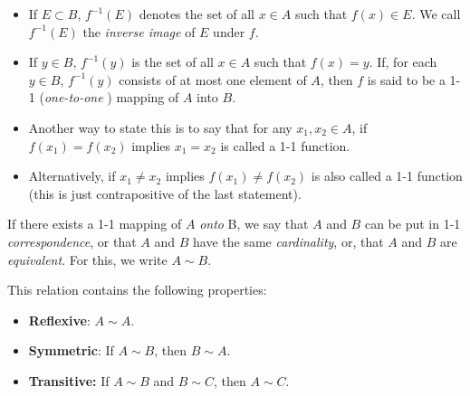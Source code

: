 \documentclass[11pt,a4paper]{book}
\begin{document}
\begin{definition}
   \begin{itemize}
       \item If \( E \subset B  \), \( f^{-1}(E) \) denotes the set of all \( x \in A  \) such that \( f(x) \in E  \). We call \( f^{-1}(E) \) the \textit{inverse image} of \( E  \) under \( f  \).
       \item If \( y \in B  \), \( f^{-1}(y) \) is the set of all \( x \in A  \) such that \( f(x) = y \). If, for each \( y \in B  \), \( f^{-1}(y) \) consists of at most one element of \( A  \), then \( f  \) is said to be a 1-1 (\textit{one-to-one} ) mapping of \( A  \) into \( B  \).
        \item Another way to state this is to say that for any \( {x}_{1}, {x}_{2} \in A  \), if \( f({x}_{1}) = f({x}_{2}) \) implies \( {x}_{1} = {x}_{2} \) is called a 1-1 function. 
        \item Alternatively, if \( {x}_{1} \neq {x}_{2}  \) implies \( f({x}_{1}) \neq f({x}_{2})\) is also called a 1-1 function (this is just contrapositive of the last statement).
   \end{itemize} 
\end{definition}

\begin{definition}[Correspondence]
    If there exists a 1-1 mapping of \( A  \) \textit{onto} B, we say that \( A  \) and \( B  \) can be put in 1-1 \textit{correspondence}, or that \( A  \) and \( B  \) have the same \textit{cardinality}, or, that \( A  \) and \( B  \) are \textit{equivalent}. For this, we write \( A \sim B   \).
\end{definition}

This relation contains the following properties:

\begin{itemize}
    \item \textbf{Reflexive}: \( A \sim A  \).
    \item \textbf{Symmetric}: If \( A \sim B  \), then \( B \sim A  \).
    \item \textbf{Transitive:} If \( A \sim B  \) and \( B \sim C  \), then \( A \sim C  \).
\end{itemize}
\end{document}
